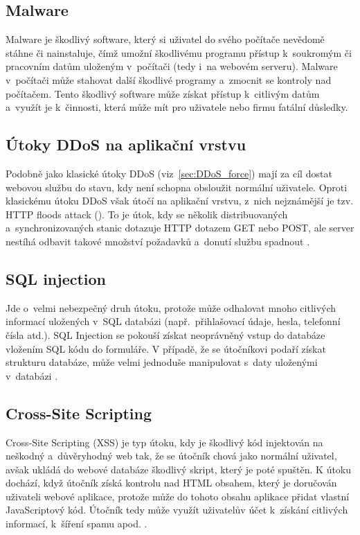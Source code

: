 \subsection*{Malware}
Malware je škodlivý software, který si uživatel do svého počítače nevědomě stáhne či nainstaluje, čímž umožní škodlivému programu přístup k~soukromým či pracovním datům uloženým v~počítači (tedy i~na webovém serveru). Malware v~počítači může stahovat další škodlivé programy a~zmocnit se kontroly nad počítačem. Tento škodlivý software může získat přístup k~citlivým datům a~využít je k~činnosti, která může mít pro uživatele nebo firmu fatální důsledky.

\subsection*{Útoky DDoS na aplikační vrstvu}
Podobně jako klasické útoky DDoS (viz~\ref{sec:DDoS_force}) mají za cíl dostat webovou službu do stavu, kdy není schopna obsloužit normální uživatele. Oproti klasickému útoku DDoS však útočí na aplikační vrstvu, z~nich nejznámější je tzv. HTTP floods attack (). To je útok, kdy se několik distribuovaných a~synchronizovaných stanic dotazuje HTTP dotazem GET nebo POST, ale server nestíhá odbavit takové množství požadavků a~donutí službu spadnout \cite{bib:HTTP_flood}.

\subsection*{SQL injection}
Jde o~velmi nebezpečný druh útoku, protože může odhalovat mnoho citlivých informací uložených v~SQL databázi (např.~přihlašovací údaje, hesla, telefonní čísla atd.). SQL Injection se pokouší získat neoprávněný vstup do databáze vložením SQL kódu do formuláře. V případě, že se útočníkovi podaří získat strukturu databáze, může velmi jednoduše manipulovat s~daty uloženými v~databázi \cite{bib:SQL_injection}.

\subsection*{Cross-Site Scripting}
Cross-Site Scripting (XSS) je typ útoku, kdy je škodlivý kód injektován na neškodný a~důvěryhodný web tak, že se útočník chová jako normální uživatel, avšak ukládá do webové databáze škodlivý skript, který je poté spuštěn. K útoku dochází, když útočník získá kontrolu nad HTML obsahem, který je doručován uživateli webové aplikace, protože může do tohoto obsahu aplikace přidat vlastní JavaScriptový kód. Útočník tedy může využít uživatelův účet k~získání citlivých informací, k~šíření spamu apod. \cite{bib:XSS, bib:XSS_vut}.

